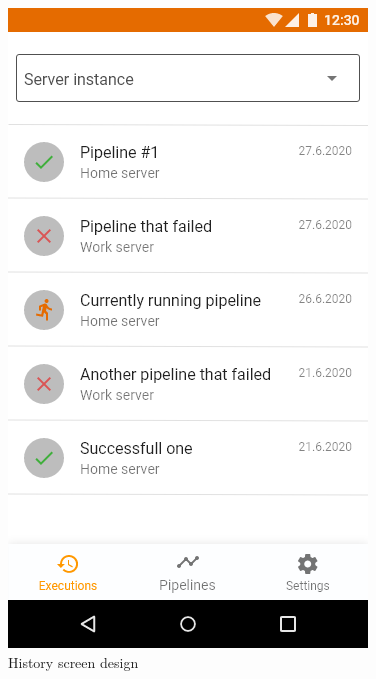 \begin{figure}\centering
    \begin{minipage}[b]{0.32\textwidth}
    	\includegraphics[width=\textwidth]{pics/xd/Bottom Navigation - executions.png}
    	\caption[History]{History screen design}\label{fig:xdHistory}
    \end{minipage}
    \begin{minipage}[b]{0.32\textwidth}

\end{minipage}
\end{figure}
